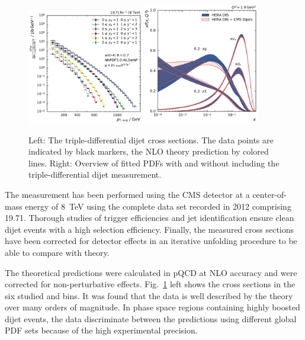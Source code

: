 \begin{figure}[h!tbp]
    \centering
    \includegraphics[width=0.45\textwidth]{figures/measurement/ptavg_spectrum.pdf}\hfill
    \includegraphics[width=0.45\textwidth]{figures/pdf_constraints/pdfcomp_direct_overview_1.9.pdf}
    \caption[Summary plot of results]{Left:
    The triple-differential dijet cross sections. The data points are indicated by black
    markers, the NLO theory prediction by colored lines. Right: Overview of
    fitted PDFs with and without including the triple-differential dijet
    measurement.}
    \label{fig:conclusion}
\end{figure}

The measurement has been performed using the CMS detector at a center-of-mass
energy of \SI{8}{\TeV} using the complete data set recorded in 2012 comprising
\SI{19.71}{\fbinv}. Thorough studies of trigger efficiencies and jet
identification ensure clean dijet events with a high selection efficiency.
Finally, the measured cross sections have been corrected for detector effects in
an iterative unfolding procedure to be able to compare with theory.

The theoretical predictions were calculated in pQCD at NLO accuracy and were
corrected for non-perturbative effects. Fig.~\ref{fig:conclusion} left shows the
cross sections in the six studied \ystar and \yboost bins. It was found that the
data is well described by the theory over many orders of magnitude. In
phase space regions containing highly boosted dijet events, the data
discriminate between the predictions using different global PDF sets because of
the high experimental precision.

